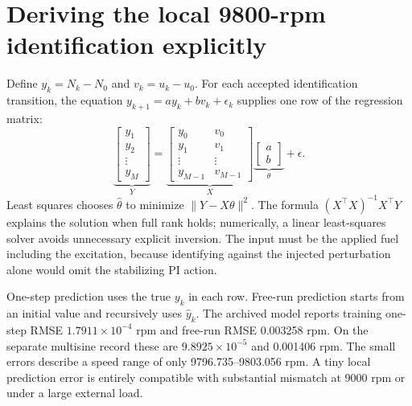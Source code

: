 \section{Deriving the local 9800-rpm identification explicitly}
Define $y_k=N_k-N_0$ and $v_k=u_k-u_0$. For each accepted identification transition, the equation $y_{k+1}=ay_k+bv_k+\epsilon_k$ supplies one row of the regression matrix:
\begin{equation}
\underbrace{\begin{bmatrix}y_1\\y_2\\\vdots\\y_M\end{bmatrix}}_{Y}
=\underbrace{\begin{bmatrix}y_0&v_0\\y_1&v_1\\\vdots&\vdots\\y_{M-1}&v_{M-1}\end{bmatrix}}_{X}
\underbrace{\begin{bmatrix}a\\b\end{bmatrix}}_{\theta}+\epsilon.
\end{equation}
Least squares chooses $\hat\theta$ to minimize $\|Y-X\theta\|^2$. The formula $(X^\top X)^{-1}X^\top Y$ explains the solution when full rank holds; numerically, a linear least-squares solver avoids unnecessary explicit inversion. The input must be the applied fuel including the excitation, because identifying against the injected perturbation alone would omit the stabilizing PI action.

One-step prediction uses the true $y_k$ in each row. Free-run prediction starts from an initial value and recursively uses $\hat y_k$. The archived model reports training one-step RMSE $1.7911\times10^{-4}$ rpm and free-run RMSE 0.003258 rpm. On the separate multisine record these are $9.8925\times10^{-5}$ and 0.001406 rpm. The small errors describe a speed range of only 9796.735--9803.056 rpm. A tiny local prediction error is entirely compatible with substantial mismatch at 9000 rpm or under a large external load.

